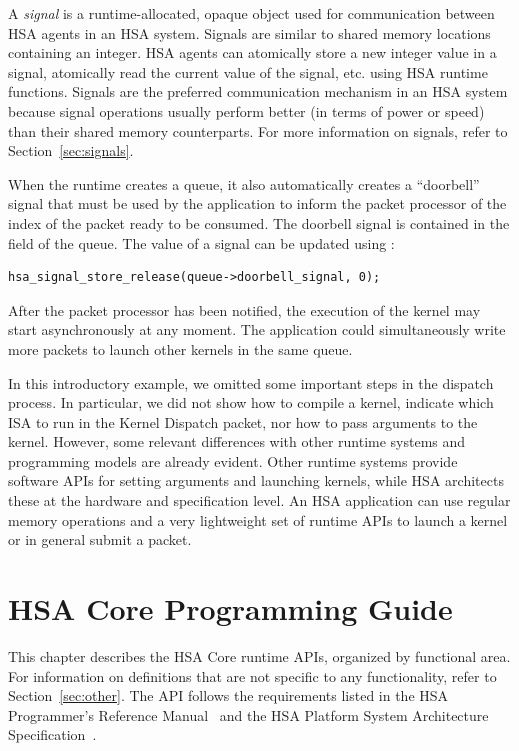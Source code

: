 \documentclass[final,oneside]{book}
\begin{document}
A \emph{signal} is a runtime-allocated, opaque object used for communication
between HSA agents in an HSA system. Signals are similar to shared memory
locations containing an integer. HSA agents can atomically store a new integer
value in a signal, atomically read the current value of the signal, etc. using
HSA runtime functions.  Signals are the preferred communication mechanism in an
HSA system because signal operations usually perform better (in terms of power
or speed) than their shared memory counterparts. For more information on
signals, refer to Section~\ref{sec:signals}.

When the runtime creates a queue, it also automatically creates a ``doorbell''
signal that must be used by the application to inform the packet processor of
the index of the packet ready to be consumed. The doorbell signal is contained
in the  field of the queue. The value of a
signal can be updated using :

\begin{lstlisting}
hsa_signal_store_release(queue->doorbell_signal, 0);
\end{lstlisting}

After the packet processor has been notified, the execution of the kernel may
start asynchronously at any moment. The application could simultaneously write
more packets to launch other kernels in the same queue.

In this introductory example, we omitted some important steps in the dispatch
process. In particular, we did not show how to compile a kernel, indicate
which ISA to run in the Kernel Dispatch packet, nor how to pass arguments to the
kernel. However, some relevant differences with other runtime systems and
programming models are already evident.  Other runtime systems provide software
APIs for setting arguments and launching kernels, while HSA architects these at
the hardware and specification level. An HSA application can use regular memory
operations and a very lightweight set of runtime APIs to launch a kernel or in
general submit a packet.


\chapter{HSA Core Programming Guide} \label{coreapi}

This chapter describes the HSA Core runtime APIs, organized by functional
area. For information on definitions that are not specific to any functionality,
refer to Section~\ref{sec:other}. The API follows the requirements listed in the
HSA Programmer's Reference Manual~\cite{prm} and the HSA Platform System
Architecture Specification~\cite{sar}.
\end{document}
